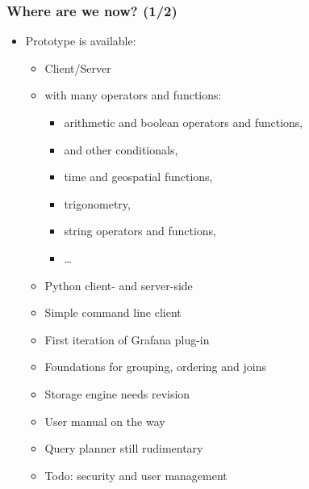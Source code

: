 \documentclass[mathserif,usenames,dvipsnames]{beamer}
\begin{document}
\begin{frame}[shrink]
\frametitle{Where are we now? (1/2)}
\begin{itemize}
\item Prototype is available:
      \bgroup
      \begin{itemize}
      \item Client/Server
      \item {} with many operators and functions:
            \begin{itemize}
            \item arithmetic and boolean operators and functions,
            \item {} and other conditionals,
            \item time and geospatial functions,
            \item trigonometry,
            \item string operators and functions,
            \item \dots
            \end{itemize}
      \item Python client- and server-side
      \item Simple command line client
      \item First iteration of Grafana plug-in
      \item Foundations for grouping, ordering and joins
      \item Storage engine needs revision
      \item User manual on the way
      \item Query planner still rudimentary
      \item Todo: security and user management
      \end{itemize}
      \egroup
\end{itemize}
\end{frame}
\end{document}

